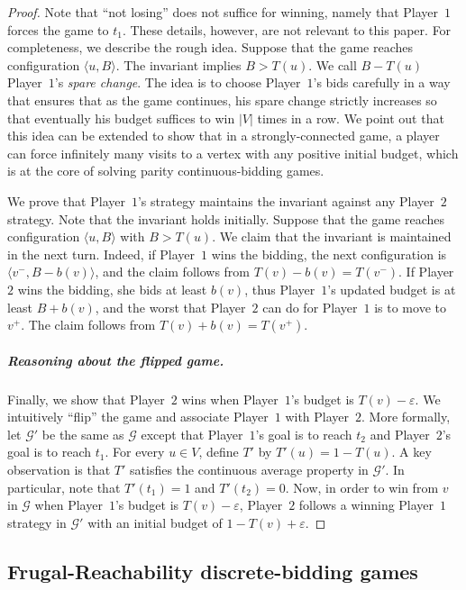 \documentclass{article}\providecommand{\nequiv}{\not\equiv}\usepackage[a4paper,margin=20mm]{geometry}
\newcommand{\PO}{Player~$1$\xspace}
\newcommand{\PT}{Player~$2$\xspace}
\newcommand{\G}{{\mathcal G}}
\newcommand{\zug}[1]{\langle #1  \rangle}
\newcommand{\eps}{\varepsilon}
\begin{document}
\begin{proof}
Note that ``not losing'' does not suffice for winning, namely that \PO forces the game to $t_1$. These details, however, are not relevant to this paper. For completeness, we describe the rough idea. 
Suppose that the game reaches configuration $\zug{u, B}$. The invariant implies $B > T(u)$. We call $B - T(u)$ \PO's {\em spare change}. 
The idea is to choose \PO's bids carefully in a way that ensures that as the game continues, his spare change strictly increases so that eventually his budget suffices to win $|V|$ times in a row. We point out that this idea can be extended to show that in a strongly-connected game, a player can force infinitely many visits to a vertex with any positive initial budget, which is at the core of solving parity continuous-bidding games. 

We prove that \PO's strategy maintains the invariant against any \PT strategy. 
Note that the invariant holds initially. Suppose that the game reaches configuration $\zug{u, B}$ with $B > T(u)$. We claim that the invariant is maintained in the next turn. 
Indeed, if \PO wins the bidding, the next configuration is $\zug{v^-, B - b(v)}$, and the claim follows from $T(v)-b(v) = T(v^-)$. 
If \PT wins the bidding, she bids at least $b(v)$, thus \PO's updated budget is at least $B + b(v)$, and the worst that \PT can do for \PO is to move to $v^+$. The claim follows from $T(v) + b(v) = T(v^+)$. 

\subparagraph*{Reasoning about the flipped game.}
Finally, we show that \PT wins when \PO's budget is $T(v) - \eps$. We intuitively ``flip'' the game and associate \PO with \PT. 
More formally, let $\G'$ be the same as $\G$ except that \PO's goal is to reach $t_2$ and \PT's goal is to reach $t_1$. 
For every $u \in V$, define $T'$ by $T'(u) = 1-T(u)$. A key observation is that $T'$ satisfies the continuous average property in $\G'$. 
In particular, note that $T'(t_1) = 1$ and $T'(t_2) = 0$. 
Now, in order to win from $v$ in $\G$ when \PO's budget is $T(v) - \varepsilon$, \PT follows a winning \PO strategy in $\G'$ with an initial budget of $1-T(v) + \varepsilon$. 
\end{proof}












\subsection{Frugal-Reachability discrete-bidding games}
\end{document}
